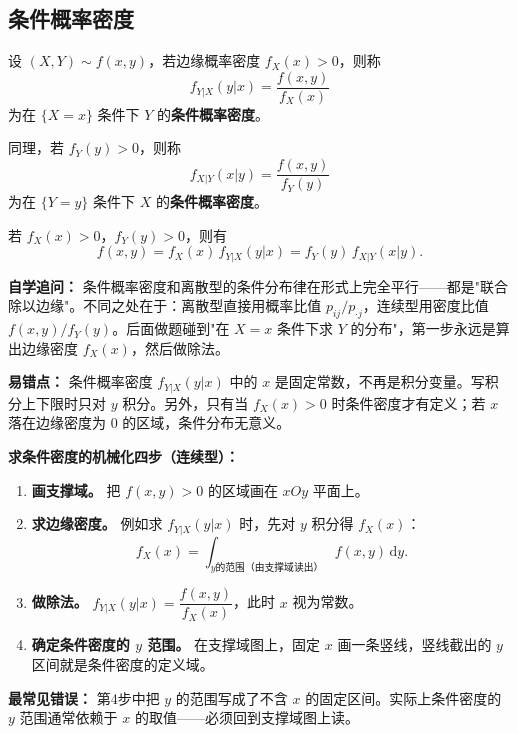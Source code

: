 ﻿\documentclass[lang=cn,11pt]{elegantbook}
\begin{document}
\subsection{条件概率密度}

\begin{definition}[条件概率密度] \label{def:conditional-pdf}
设 $(X,Y) \sim f(x,y)$，若边缘概率密度 $f_X(x) > 0$，则称
\[
f_{Y|X}(y|x) = \frac{f(x,y)}{f_X(x)}
\]
为在 $\{X = x\}$ 条件下 $Y$ 的\textbf{条件概率密度}。

同理，若 $f_Y(y) > 0$，则称
\[
f_{X|Y}(x|y) = \frac{f(x,y)}{f_Y(y)}
\]
为在 $\{Y = y\}$ 条件下 $X$ 的\textbf{条件概率密度}。
\end{definition}

\begin{property}[概率密度乘法公式]\label{prop:pdf-multiplication}
若 $f_X(x) > 0$，$f_Y(y) > 0$，则有
\[
f(x,y) = f_X(x)\,f_{Y|X}(y|x) = f_Y(y)\,f_{X|Y}(x|y).
\]
\end{property}

\begin{note}
\textbf{自学追问：} 条件概率密度和离散型的条件分布律在形式上完全平行——都是"联合除以边缘"。不同之处在于：离散型直接用概率比值 $p_{ij}/p_{\cdot j}$，连续型用密度比值 $f(x,y)/f_Y(y)$。后面做题碰到"在 $X=x$ 条件下求 $Y$ 的分布"，第一步永远是算出边缘密度 $f_X(x)$，然后做除法。

\textbf{易错点：} 条件概率密度 $f_{Y|X}(y|x)$ 中的 $x$ 是固定常数，不再是积分变量。写积分上下限时只对 $y$ 积分。另外，只有当 $f_X(x)>0$ 时条件密度才有定义；若 $x$ 落在边缘密度为 $0$ 的区域，条件分布无意义。
\end{note}

\begin{note}
\textbf{求条件密度的机械化四步（连续型）：}
\begin{enumerate}
    \item \textbf{画支撑域。} 把 $f(x,y)>0$ 的区域画在 $xOy$ 平面上。
    \item \textbf{求边缘密度。} 例如求 $f_{Y|X}(y|x)$ 时，先对 $y$ 积分得 $f_X(x)$：
    \[
    f_X(x)=\int_{\text{$y$的范围（由支撑域读出）}} f(x,y)\,\mathrm{d}y.
    \]
    \item \textbf{做除法。} $f_{Y|X}(y|x)=\dfrac{f(x,y)}{f_X(x)}$，此时 $x$ 视为常数。
    \item \textbf{确定条件密度的 $y$ 范围。} 在支撑域图上，固定 $x$ 画一条竖线，竖线截出的 $y$ 区间就是条件密度的定义域。
\end{enumerate}
\textbf{最常见错误：} 第4步中把 $y$ 的范围写成了不含 $x$ 的固定区间。实际上条件密度的 $y$ 范围通常依赖于 $x$ 的取值——必须回到支撑域图上读。
\end{note}
\end{document}
